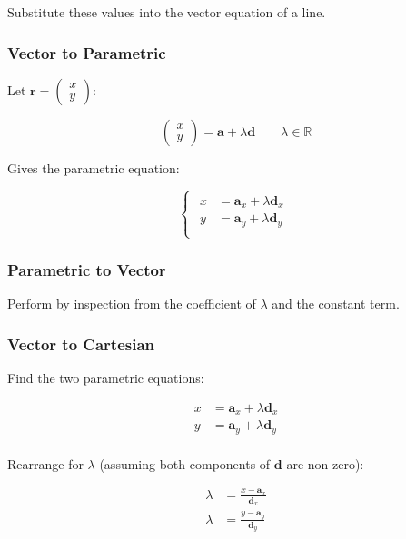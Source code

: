 \documentclass[a4paper,11pt]{report}
\newcommand{\bb}{\boldsymbol}
\begin{document}
Substitute these values into the vector equation of a line.

\subsubsection{Vector to Parametric}

Let $\bb{r} = \begin{pmatrix} x \\ y \end{pmatrix}$:

$$
\begin{pmatrix} x \\ y \end{pmatrix} = \bb{a} + \lambda \bb{d} \qquad \lambda \in \mathbb{R}
$$

Gives the parametric equation:

$$
\begin{cases}
\begin{aligned}
x & = \bb{a}_x + \lambda \bb{d}_x \\
y & = \bb{a}_y + \lambda \bb{d}_y \\
\end{aligned}
\end{cases}
$$

\subsubsection{Parametric to Vector}

Perform by inspection from the coefficient of $\lambda$ and the constant
term.

\subsubsection{Vector to Cartesian}

Find the two parametric equations:

$$
\begin{aligned}
x & = \bb{a}_x + \lambda \bb{d}_x \\
y & = \bb{a}_y + \lambda \bb{d}_y \\
\end{aligned}
$$

Rearrange for $\lambda$ (assuming both components of $\bb{d}$ are non-zero):

$$
\begin{aligned}
\lambda & = \frac{x - \bb{a}_x}{\bb{d}_x} \\
\lambda & = \frac{y - \bb{a}_y}{\bb{d}_y} \\
\end{aligned}
$$
\end{document}
